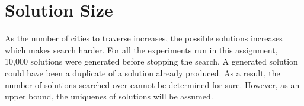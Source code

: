 

\section{Solution Size}
As the number of cities to traverse increases, the possible solutions increases which makes search harder.  For all the experiments run in this assignment, 10,000 solutions were generated before stopping the search.  A generated solution could have been a duplicate of a solution already produced.  As a result, the number of solutions searched over cannot be determined for sure.  However, as an upper bound, the uniquenes of solutions will be assumed.  